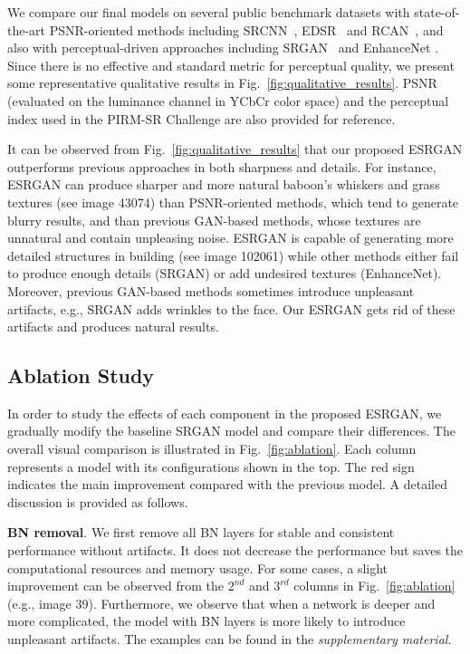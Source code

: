 \documentclass[runningheads]{llncs}
\begin{document}
We compare our final models on several public benchmark datasets with state-of-the-art PSNR-oriented methods including 
SRCNN~\cite{dong2014learning}, EDSR~\cite{lim2017enhanced} and RCAN~\cite{zhang2018image}, and also with 
perceptual-driven approaches including SRGAN~\cite{ledig2017photo} and EnhanceNet \cite{sajjadi2017enhancenet}. 
Since there is no effective and standard metric for perceptual quality, we present some representative qualitative  
results in Fig.~\ref{fig:qualitative_results}. 
%
PSNR (evaluated on the luminance channel in YCbCr color space) and the perceptual index used in the PIRM-SR Challenge 
are 
also provided for reference.


It can be observed from Fig.~\ref{fig:qualitative_results} that our proposed ESRGAN outperforms previous approaches in 
both sharpness and details.
%
For instance, ESRGAN can produce sharper and more natural baboon's whiskers and grass textures (see image 43074) than 
PSNR-oriented 
methods, which tend to generate blurry results, and than previous GAN-based methods, whose textures are unnatural and 
contain unpleasing noise. 
%
ESRGAN is capable of generating more detailed structures in building (see image 102061) while other methods either fail 
to produce enough details (SRGAN) or add undesired textures (EnhanceNet).
%
Moreover, previous GAN-based methods sometimes introduce unpleasant artifacts, e.g., SRGAN adds wrinkles to the face. 
Our 
ESRGAN gets rid of these artifacts and produces natural results.


\subsection{Ablation Study} \label{subsec:ablation_study}

In order to study the effects of each component in the proposed ESRGAN, we gradually modify the baseline SRGAN model 
and compare their differences. 
%
The overall visual comparison is illustrated in Fig.~\ref{fig:ablation}. Each column represents a model with its 
configurations shown in the top. The red sign indicates the main improvement compared with the previous model.
%
A detailed discussion is provided as follows.

\noindent \textbf{BN removal}.
We first remove all BN layers for stable and consistent performance without artifacts.
%
It does not decrease the performance but saves the computational resources and memory usage.
%
For some cases, a slight improvement can be observed from the $2^{nd}$ and $3^{rd}$ columns in Fig.~\ref{fig:ablation} 
(e.g., image 39).
%
Furthermore, we observe that when a network is deeper and more complicated, the model with BN layers is more likely  
to introduce unpleasant artifacts. The examples can be found in the \textit{supplementary material}.
\end{document}
